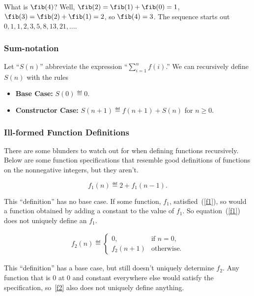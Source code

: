 What is $\fib(4)$?  Well, $\fib(2) =
\fib(1)+\fib(0) = 1$, $\fib(3) =
\fib(2)+\fib(1) = 2$, so $\fib(4) = 3$.  The sequence
starts out $0, 1, 1, 2, 3, 5, 8, 13, 21,\dots$.

\subsubsection{Sum-notation}

Let ``$S(n)$'' abbreviate the expression ``$\sum_{i=1}^n f(i)$.''  We
can recursively define $S(n)$ with the rules
\begin{itemize}
\item\textbf{Base Case:} $S(0) \eqdef 0$.
\item\textbf{Constructor Case:} $S(n+1) \eqdef  f(n+1) + S(n)$ for $n\geq 0$.
\end{itemize}

\subsubsection{Ill-formed Function Definitions}

There are some blunders to watch out for when defining functions
recursively.  Below are some function specifications that resemble
good definitions of functions on the nonnegative integers, but they
aren't.
\begin{definition}
\begin{equation}\label{f1}
f_1(n)\eqdef 2+f_1(n-1).
\end{equation}
\end{definition}
This ``definition'' has no base case.  If some function, $f_1$,
satisfied~(\ref{f1}), so would a function obtained by adding a constant to
the value of $f_1$.  So equation~(\ref{f1}) does not uniquely define
an $f_1$.

\begin{definition}
\begin{eqnarray}\label{f2}
f_2(n) \eqdef
\begin{cases}
 0, & \text{if $n=0$},\\
 f_2(n+1) &  \text{otherwise}.
\end{cases}
\end{eqnarray}
\end{definition}
This ``definition'' has a base case, but still doesn't uniquely determine
$f_2$.  Any function that is 0 at 0 and constant everywhere else would
satisfy the specification, so~\eqref{f2} also does not uniquely define
anything.

